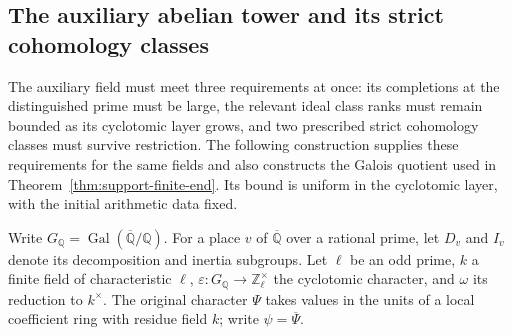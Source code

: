 \subsection{The auxiliary abelian tower and its strict cohomology classes}
\label{sec:support-auxiliary-tower}

The auxiliary field must meet three requirements at once: its completions
at the distinguished prime must be large, the relevant ideal class ranks
must remain bounded as its cyclotomic layer grows, and two prescribed
strict cohomology classes must survive restriction.  The following
construction supplies these requirements for the same fields and also
constructs the Galois quotient used in
Theorem~\ref{thm:support-finite-end}.  Its bound is uniform in the
cyclotomic layer, with the initial arithmetic data fixed.

Write $G_{\mathbb Q}=\operatorname{Gal}(\overline{\mathbb Q}/\mathbb Q)$.
For a place $v$ of $\overline{\mathbb Q}$ over a rational prime, let
$D_v$ and $I_v$ denote its decomposition and inertia subgroups.  Let
$\ell$ be an odd prime, $k$ a finite field of characteristic $\ell$,
$\varepsilon:G_{\mathbb Q}\to\mathbb Z_\ell^\times$ the cyclotomic
character, and $\omega$ its reduction to $k^\times$.  The original
character $\Psi$ takes values in the units of a local coefficient
ring with residue field $k$; write $\psi=\overline\Psi$.

